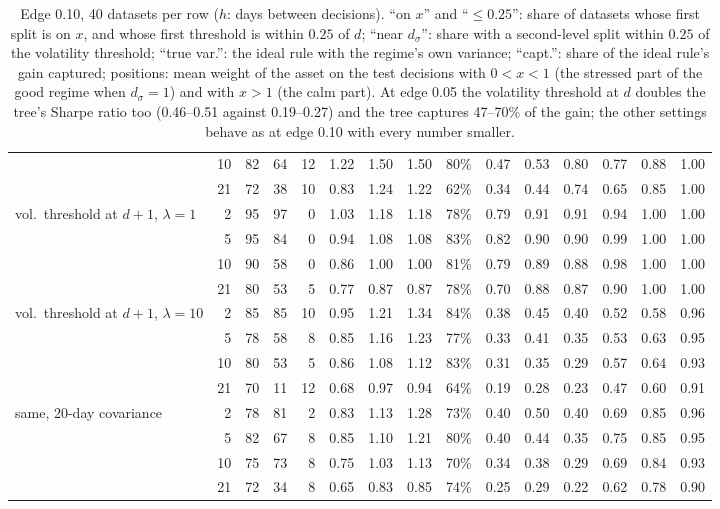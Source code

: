 \documentclass[11pt,a4paper]{article}
\newcommand{\1}{\mathbf{1}}
\begin{document}
\begin{table}[H]
\begin{tabular}{@{}l r rr r rrr r rrr rrr@{}}
 & 10 & 82 & 64 & 12 & 1.22 & 1.50 & 1.50 & 80\% & 0.47 & 0.53 & 0.80 & 0.77 & 0.88 & 1.00\\
 & 21 & 72 & 38 & 10 & 0.83 & 1.24 & 1.22 & 62\% & 0.34 & 0.44 & 0.74 & 0.65 & 0.85 & 1.00\\
\midrule
vol.\ threshold at $d+1$, $\lambda=1$ & 2 & 95 & 97 & 0 & 1.03 & 1.18 & 1.18 & 78\% & 0.79 & 0.91 & 0.91 & 0.94 & 1.00 & 1.00\\
 & 5 & 95 & 84 & 0 & 0.94 & 1.08 & 1.08 & 83\% & 0.82 & 0.90 & 0.90 & 0.99 & 1.00 & 1.00\\
 & 10 & 90 & 58 & 0 & 0.86 & 1.00 & 1.00 & 81\% & 0.79 & 0.89 & 0.88 & 0.98 & 1.00 & 1.00\\
 & 21 & 80 & 53 & 5 & 0.77 & 0.87 & 0.87 & 78\% & 0.70 & 0.88 & 0.87 & 0.90 & 1.00 & 1.00\\
\midrule
vol.\ threshold at $d+1$, $\lambda=10$ & 2 & 85 & 85 & 10 & 0.95 & 1.21 & 1.34 & 84\% & 0.38 & 0.45 & 0.40 & 0.52 & 0.58 & 0.96\\
 & 5 & 78 & 58 & 8 & 0.85 & 1.16 & 1.23 & 77\% & 0.33 & 0.41 & 0.35 & 0.53 & 0.63 & 0.95\\
 & 10 & 80 & 53 & 5 & 0.86 & 1.08 & 1.12 & 83\% & 0.31 & 0.35 & 0.29 & 0.57 & 0.64 & 0.93\\
 & 21 & 70 & 11 & 12 & 0.68 & 0.97 & 0.94 & 64\% & 0.19 & 0.28 & 0.23 & 0.47 & 0.60 & 0.91\\
\midrule
same, 20-day covariance & 2 & 78 & 81 & 2 & 0.83 & 1.13 & 1.28 & 73\% & 0.40 & 0.50 & 0.40 & 0.69 & 0.85 & 0.96\\
 & 5 & 82 & 67 & 8 & 0.85 & 1.10 & 1.21 & 80\% & 0.40 & 0.44 & 0.35 & 0.75 & 0.85 & 0.95\\
 & 10 & 75 & 73 & 8 & 0.75 & 1.03 & 1.13 & 70\% & 0.34 & 0.38 & 0.29 & 0.69 & 0.84 & 0.93\\
 & 21 & 72 & 34 & 8 & 0.65 & 0.83 & 0.85 & 74\% & 0.25 & 0.29 & 0.22 & 0.62 & 0.78 & 0.90\\
\bottomrule
\end{tabular}
\caption{Edge 0.10, 40 datasets per row ($h$: days between decisions). ``on $x$'' and ``$\le0.25$'': share of datasets whose first split is on $x$, and whose first threshold is within $0.25$ of $d$; ``near $d_\sigma$'': share with a second-level split within $0.25$ of the volatility threshold; ``true var.'': the ideal rule with the regime's own variance; ``capt.'': share of the ideal rule's gain captured; positions: mean weight of the asset on the test decisions with $0<x<1$ (the stressed part of the good regime when $d_\sigma=1$) and with $x>1$ (the calm part). At edge 0.05 the volatility threshold at $d$ doubles the tree's Sharpe ratio too (0.46--0.51 against 0.19--0.27) and the tree captures 47--70\% of the gain; the other settings behave as at edge 0.10 with every number smaller.}
\label{tab:regime}
\end{table}
\end{document}

